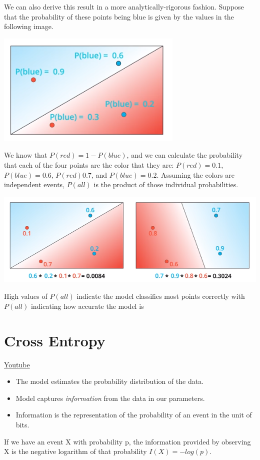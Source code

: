 We can also derive this result in a more analytically-rigorous fashion. Suppose that the probability of these points being blue is given by the values in the following image.

\includegraphics[width=0.5\linewidth]{img//intro/neural-networks-7.png}

We know that \(P(red) = 1 - P(blue)\), and we can calculate the probability that each of the four points are the color that they are: \(P(red) = 0.1\), \(P(blue) = 0.6\), \(P(red) 0.7\), and \(P(blue) = 0.2\). Assuming the colors are independent events, \(P(all)\) is the product of those individual probabilities.

\includegraphics[width=1\linewidth]{img//intro/neural-networks-8.png}

High values of \(P(all)\) indicate the model classifies most points correctly with \(P(all)\) indicating how accurate the model is


\section{Cross Entropy}
\href{https://www.youtube.com/watch?v=LaYIdluNsZE&t=180s&ab_channel=Udacity}{Youtube}

\begin{itemize}
    \item The model estimates the probability distribution of the data.
    \item Model captures \textit{information} from the data in our parameters.
    \item Information is the representation of  the probability of an event in the unit of bits.
\end{itemize}
If we have an event X with probability p, the information provided by observing X is the negative logarithm of that probability \(I(X) = -log(p)\). \newline

